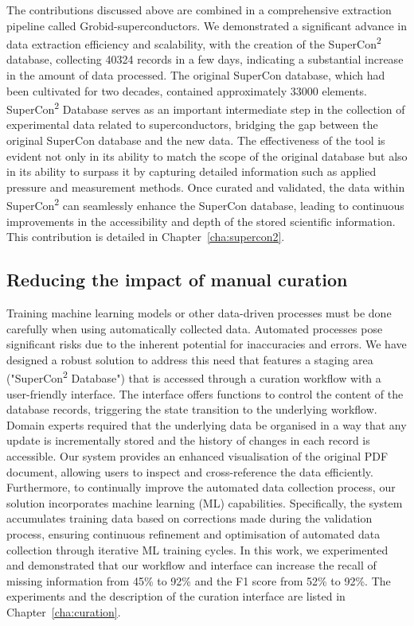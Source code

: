 The contributions discussed above are combined in a comprehensive extraction pipeline called Grobid-superconductors.
We demonstrated a significant advance in data extraction efficiency and scalability, with the creation of the SuperCon\textsuperscript{2} database, collecting 40324 records in a few days, indicating a substantial increase in the amount of data processed.
The original SuperCon database, which had been cultivated for two decades, contained approximately 33000 elements.
SuperCon\textsuperscript{2} Database serves as an important intermediate step in the collection of experimental data related to superconductors, bridging the gap between the original SuperCon database and the new data. 
The effectiveness of the tool is evident not only in its ability to match the scope of the original database but also in its ability to surpass it by capturing detailed information such as applied pressure and measurement methods. 
Once curated and validated, the data within SuperCon\textsuperscript{2} can seamlessly enhance the SuperCon database, leading to continuous improvements in the accessibility and depth of the stored scientific information.
This contribution is detailed in Chapter~\ref{cha:supercon2}.

\subsection{Reducing the impact of manual curation}
\label{sec:intro-curation}

Training machine learning models or other data-driven processes must be done carefully when using automatically collected data. 
Automated processes pose significant risks due to the inherent potential for inaccuracies and errors.
We have designed a robust solution to address this need that features a staging area ("SuperCon\textsuperscript{2} Database") that is accessed through a curation workflow with a user-friendly interface. 
The interface offers functions to control the content of the database records, triggering the state transition to the underlying workflow. 
Domain experts required that the underlying data be organised in a way that any update is incrementally stored and the history of changes in each record is accessible. 
Our system provides an enhanced visualisation of the original PDF document, allowing users to inspect and cross-reference the data efficiently. 
Furthermore, to continually improve the automated data collection process, our solution incorporates machine learning (ML) capabilities. 
Specifically, the system accumulates training data based on corrections made during the validation process, ensuring continuous refinement and optimisation of automated data collection through iterative ML training cycles.
In this work, we experimented and demonstrated that our workflow and interface can increase the recall of missing information from 45\% to 92\% and the F1 score from 52\% to 92\%. 
The experiments and the description of the curation interface are listed in Chapter~\ref{cha:curation}.